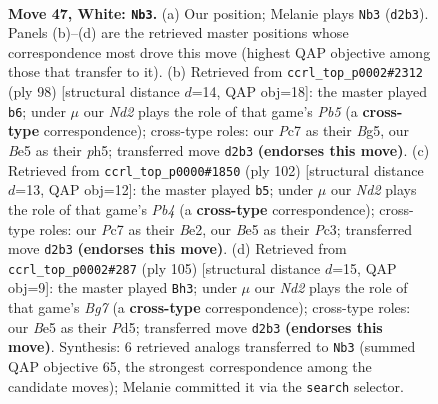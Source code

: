 \documentclass[11pt]{article}
\begin{document}
\clearpage

\begin{figure}[p]\centering
\begin{subfigure}{0.46\textwidth}\centering
\resizebox{\linewidth}{!}{%
\newchessgame
\chessboard[
  setfen={6k1/2P5/2r5/4B3/5K2/8/3N4/8 w - - 7 47},
  showmover=false,
  pgfstyle=straightmove, color=movearrow, markmove={d2-b3}
]}
\caption{}
\end{subfigure}\hfill
\begin{subfigure}{0.46\textwidth}\centering
\resizebox{\linewidth}{!}{%
\newchessgame
\chessboard[
  setfen={8/5k2/8/1PP3Bp/5K2/8/6r1/8 w - - 1 50},
  showmover=false,
  pgfstyle=straightmove, color=movearrow, markmove={b5-b6}
]}
\caption{}
\end{subfigure}
\\[4pt]
\begin{subfigure}{0.46\textwidth}\centering
\resizebox{\linewidth}{!}{%
\newchessgame
\chessboard[
  setfen={8/2p5/4k3/8/1P6/2PK4/4B1r1/8 w - - 0 52},
  showmover=false,
  pgfstyle=straightmove, color=movearrow, markmove={b4-b5}
]}
\caption{}
\end{subfigure}\hfill
\begin{subfigure}{0.46\textwidth}\centering
\resizebox{\linewidth}{!}{%
\newchessgame
\chessboard[
  setfen={8/8/5p2/3p4/5R2/8/1K2k1b1/8 b - - 7 53},
  showmover=false,
  pgfstyle=straightmove, color=movearrow, markmove={g2-h3}
]}
\caption{}
\end{subfigure}
\caption{\textbf{Move 47, White: \texttt{Nb3}.} (a) Our position; Melanie plays \texttt{Nb3} (\texttt{d2b3}). Panels (b)--(d) are the retrieved master positions whose correspondence most drove this move (highest QAP objective among those that transfer to it). (b) Retrieved from \texttt{ccrl\_top\_p0002\#2312} (ply 98) [structural distance $d$=14, QAP obj=18]: the master played \texttt{b6}; under $\mu$ our \emph{Nd2} plays the role of that game's \emph{Pb5} (a \textbf{cross-type} correspondence); cross-type roles: our \emph{P}c7 as their \emph{B}g5, our \emph{B}e5 as their \emph{p}h5; transferred move \texttt{d2b3} \textbf{(endorses this move)}. (c) Retrieved from \texttt{ccrl\_top\_p0000\#1850} (ply 102) [structural distance $d$=13, QAP obj=12]: the master played \texttt{b5}; under $\mu$ our \emph{Nd2} plays the role of that game's \emph{Pb4} (a \textbf{cross-type} correspondence); cross-type roles: our \emph{P}c7 as their \emph{B}e2, our \emph{B}e5 as their \emph{P}c3; transferred move \texttt{d2b3} \textbf{(endorses this move)}. (d) Retrieved from \texttt{ccrl\_top\_p0002\#287} (ply 105) [structural distance $d$=15, QAP obj=9]: the master played \texttt{Bh3}; under $\mu$ our \emph{Nd2} plays the role of that game's \emph{Bg7} (a \textbf{cross-type} correspondence); cross-type roles: our \emph{B}e5 as their \emph{P}d5; transferred move \texttt{d2b3} \textbf{(endorses this move)}. Synthesis: 6 retrieved analogs transferred to \texttt{Nb3} (summed QAP objective 65, the strongest correspondence among the candidate moves); Melanie committed it via the \texttt{search} selector.}
\label{fig:thought-m92}
\end{figure}
\end{document}
